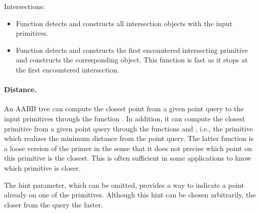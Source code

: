 Intersections:
\begin{itemize}
\item Function  detects and constructs all intersection objects with the input primitives.
\item Function  detects and constructs the first encountered intersecting primitive and constructs the corresponding object. This function is fast as it stops at the first encountered intersection.
\end{itemize}

\paragraph{Distance.} An AABB tree can compute the closest point from a given point query to the input primitives through the function . In addition, it can compute the closest primitive from a given point query through the functions  and , i.e., the primitive which realizes the minimum distance from the point query. The latter function is a loose version of the primer in the sense that it does not precise which point on this primitive is the closest. This is often sufficient in some applications to know which primitive is closer. 

The hint parameter, which can be omitted, provides a way to indicate a point already on one of the primitives. Although this hint can be chosen arbitrarily, the closer from the query the faster. 